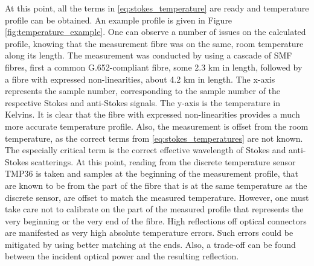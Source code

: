 \documentclass{standalone}
\begin{document}
At this point, all the terms in \ref{eq:stokes_temperature} are ready and temperature profile can be obtained. An example profile is given in Figure \ref{fig:temperature_example}.
One can observe a number of issues on the calculated profile, knowing that the measurement fibre was on the same, room temperature along its length. The measurement was conducted by using a cascade of SMF fibres, first a common G.652-compliant fibre, some 2.3 km in length, followed by a fibre with expressed non-linearities, about 4.2 km in length. The x-axis represents the sample number, corresponding to the sample number of the respective Stokes and anti-Stokes signals. The y-axis is the temperature in Kelvins. It is clear that the fibre with expressed non-linearities provides a much more accurate temperature profile. Also, the measurement is offset from the room temperature, as the correct terms from \ref{eq:stokes_temperatures} are not known. The especially critical term is the correct effective wavelength of Stokes and anti-Stokes scatterings. At this point, reading from the discrete temperature sensor TMP36 is taken and samples at the beginning of the measurement profile, that are known to be from the part of the fibre that is at the same temperature as the discrete sensor, are offset to match the measured temperature. However, one must take care not to calibrate on the part of the measured profile that represents the very beginning or the very end of the fibre. High reflections off optical connectors are manifested as very high absolute temperature errors. Such errors could be mitigated by using better matching at the ends. Also, a trade-off can be found between the incident optical power and the resulting reflection. \\
\end{document}
